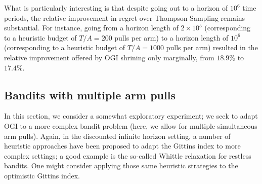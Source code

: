 What is particularly interesting is that despite going out to a horizon of $10^6$ time periods, the relative improvement in regret over {\color{blue} Thompson Sampling} remains substantial. For instance, going from a horizon length of $2 \times 10^5$ (corresponding to a heuristic budget of $T/A = 200$ pulls per arm) 
to a horizon length of $10^6$ (corresponding to a heuristic budget of $T/A = 1000$ pulls per arm) resulted in the relative improvement offered by OGI shrining only marginally, from $18.9\%$ to $17.4\%$. 




\subsection{Bandits with multiple arm pulls}

In this section, we consider a somewhat exploratory experiment; we seek to adapt OGI to a more complex bandit problem (here, we allow for multiple simultaneous arm pulls). Again, in the discounted infinite horizon setting, a number of heuristic approaches have been proposed to adapt the Gittins index to more complex settings; a good example is the so-called Whittle relaxation for restless bandits. One might consider applying those same heuristic strategies to the optimistic Gittins index. 

